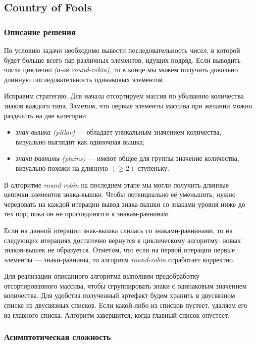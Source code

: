 \subsection{Country of Fools}

\subsubsection{Описание решения}

По условию задачи необходимо вывести последовательность чисел, в которой будет больше всего пар различных элементов, идущих подряд. Если выводить числа циклично \textit{(а-ля round-robin)}, то в конце мы можем получить довольно длинную последовательность одинаковых элементов.

Исправим стратегию. Для начала отсортируем массив по убыванию количества знаков каждого типа. Заметим, что первые элементы массива при желании можно разделить на две категории:
\begin{itemize}
  \item \textit{знак-вышка (pillar)} --- обладает уникальным значением количества, визуально выглядит как одиночная вышка;
  \item \textit{знаки-равнины (plains)} --- имеют общее для группы значение количества, визуально похожи на длинную \( (\geq 2) \) ступеньку. 
\end{itemize}

В алгоритме \textit{round-robin} на последнем этапе мы могли получить длинные цепочки элементов знака-вышки. Чтобы потенциально её уменьшить, нужно чередовать на каждой итерации вывод знака-вышки со знаками уровня ниже до тех пор, пока он не присоединятся к знакам-равнинам.

Если на данной итерации знак-вышка слилась со знаками-равнинами, то на следующих итерациях достаточно вернутся к циклическому алгоритму: новых знаков-вышек не образуется. Отметим, что если на первой итерации первые элементы --- знаки-равнины, то алгоритм \textit{round-robin} отработает корректно.

Для реализации описанного алгоритма выполним предобработку отсортированного массива, чтобы сгруппировать знаки с одинаковым значением количества. Для удобства полученный артефакт будем хранить в двусвязном списке из двусвязных списков. Если какой-либо из списков пустеет, удаляем его из главного списка. Алгоритм завершится, когда главный список опустеет.

\subsubsection{Асимптотическая сложность}

